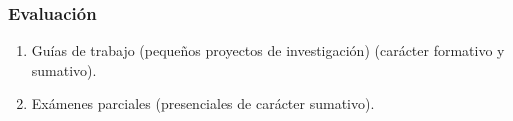 \begin{refsection}
\subsubsection*{Evaluación}

\begin{enumerate}
\item Guías de trabajo (pequeños proyectos de investigación) (carácter formativo y sumativo).
\item Exámenes parciales (presenciales de carácter sumativo).
\end{enumerate}

\nocite{Bla12}
\nocite{GW14}
\nocite{HPS72}
\nocite{Dur19}
\nocite{GS01}
\nocite{Shi16}

\printcursosbibliography

\end{refsection}
